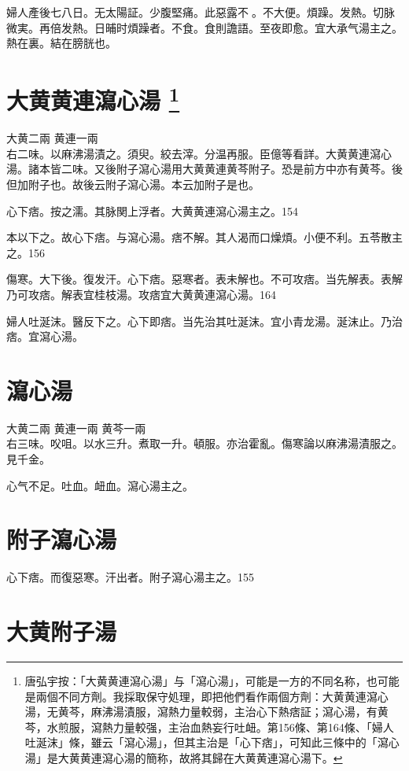 {\khaaitp 婦人}產後七八日。无太陽証。少腹堅痛。此惡露不{\sungtpii 𥁞}。不大便。煩躁。发熱。切脉微実。再倍发熱。日晡时煩躁者。不食。食則譫語。至夜即愈。宜大承气湯主之。熱在裏。結在膀胱也。{\dengben}

\section{大黄黄連瀉心湯
	\footnote{
		唐弘宇按：「大黄黄連瀉心湯」与「瀉心湯」，可能是一方的不同名称，也可能是兩個不同方劑。我採取保守処理，即把他們看作兩個方劑：大黄黄連瀉心湯，无黄芩，麻沸湯漬服，瀉熱力量較弱，主治心下熱痞証；瀉心湯，有黄芩，水煎服，瀉熱力量較强，主治血熱妄行吐衄。第156條、第164條、「婦人吐涎沫」條，雖云「瀉心湯」，但其主治是「心下痞」，可知此三條中的「瀉心湯」是大黄黄連瀉心湯的簡称，故將其歸在大黄黄連瀉心湯下。
	}
}

大黄{\scriptsize 二兩} 黄連{\scriptsize 一兩}\\
右二味。以麻沸湯漬之。須臾。絞去滓。分温再服。{\scriptsize 臣億等看詳。大黄黄連瀉心湯。諸本皆二味。又後附子瀉心湯用大黄黄連黄芩附子。恐是前方中亦有黄芩。後但加附子也。故後云附子瀉心湯。本云加附子是也。}

心下痞。按之濡。其脉関上浮者。大黄{\khaaitp 黄連}瀉心湯主之。154

本以下之。故心下痞。与瀉心湯。痞不解。其人渴而口燥{\khaaitp 煩}。小便不利。五苓散主之。156

傷寒。大下後。復发汗。心下痞。惡寒者。表未解也。不可攻痞。当先解表。表解乃可攻痞。解表宜桂枝湯。攻痞宜大黄黄連瀉心湯。164

婦人吐涎沫。醫反下之。心下即痞。当先治其吐涎沫。宜小青龙湯。涎沫止。乃治痞。宜瀉心湯。

\section{瀉心湯}

大黄{\scriptsize 二兩} 黄連{\scriptsize 一兩} 黄芩{\scriptsize 一兩}\\
右三味。㕮咀。以水三升。煮取一升。頓服。亦治霍亂。{\scriptsize 傷寒論以麻沸湯漬服之。見千金。}

心气不足。吐血。衄血。瀉心湯主之。

\section{附子瀉心湯}

心下痞。而復惡寒。汗出者。附子瀉心湯主之。155

\section{大黄附子湯}

